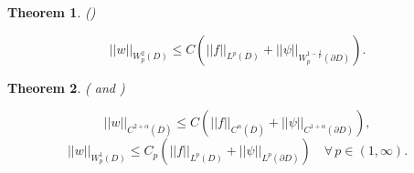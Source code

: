 \documentclass[twoside,10pt]{article}
\newtheorem{theorem}{\bf Theorem}[section]
\numberwithin{equation}{section}
\begin{document}
\begin{theorem}\emph{(\cite[Theorem\,2.6 and Corrollary\,2.10]{SW2009})}

	\begin{equation}\label{eq:C2}
		||w||_{W^{2}_p(D)}\le C \left(
		||f||_{L^p(D)} + ||\psi||_{W^{1-\frac{1}{p}}_p(\partial D)}
		\right).
	\end{equation}
\end{theorem}
\begin{theorem}\emph{(\cite[Theorems\,3.1 and 3.2]{LN1968} and \cite[Proposition\,3.3]{Amann1976})}
\label{C:2}


\begin{equation}
	||w||_{C^{2+\alpha}(\overline{D})} \le C \left( ||f||_{C^{\alpha}(\overline{D})} +
	||\psi||_{C^{1+\alpha}(\partial D)}
	\right),
\end{equation}
\begin{equation}
	||w||_{W^1_p(D)} \le C_p
	\left(
	||f||_{L^p(D)} + ||\psi||_{L^p(\partial D)}
	\right)\quad \forall\, p\in (1,\infty).
\end{equation}
\end{theorem}
\end{document}
